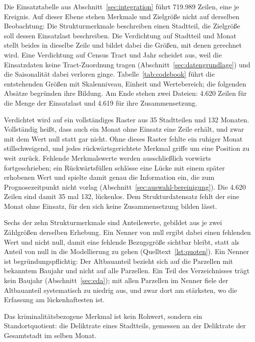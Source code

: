 Die Einsatztabelle aus Abschnitt~\ref{sec:integration} führt 719.989 Zeilen,
eine je Ereignis. Auf dieser Ebene stehen Merkmale und Zielgröße nicht auf
derselben Beobachtung: Die Strukturmerkmale beschreiben einen Stadtteil, die
Zielgröße soll dessen Einsatzlast beschreiben. Die Verdichtung auf Stadtteil
und Monat stellt beides in dieselbe Zeile und bildet dabei die Größen, mit
denen gerechnet wird. Eine Verdichtung auf Census Tract und Jahr scheidet aus,
weil die Einsatzdaten keine Tract-Zuordnung tragen
(Abschnitt~\ref{sec:datengrundlage}) und die Saisonalität dabei verloren ginge.
Tabelle~\ref{tab:codebook} führt die entstehenden Größen mit Skalenniveau,
Einheit und Wertebereich; die folgenden Absätze begründen ihre Bildung. Am Ende
stehen zwei Dateien: 4.620 Zeilen für die Menge der Einsatzlast und 4.619 für
ihre Zusammensetzung.

Verdichtet wird auf ein vollständiges Raster aus 35 Stadtteilen und 132
Monaten. Vollständig heißt, dass auch ein Monat ohne Einsatz eine Zeile erhält,
und zwar mit dem Wert null statt gar nicht. Ohne dieses Raster fehlte ein
ruhiger Monat stillschweigend, und jedes rückwärtsgerichtete Merkmal griffe um
eine Position zu weit zurück. Fehlende Merkmalswerte werden ausschließlich
vorwärts fortgeschrieben; ein Rückwärtsfüllen schlösse eine Lücke mit einem
später erhobenen Wert und spielte damit genau die Information ein, die zum
Prognosezeitpunkt nicht vorlag (Abschnitt~\ref{sec:auswahl-bereinigung}). Die
4.620 Zeilen sind damit 35 mal 132, lückenlos. Dem Strukturdatensatz fehlt der
eine Monat ohne Einsatz, für den sich keine Zusammensetzung bilden lässt.

Sechs der zehn Strukturmerkmale sind Anteilswerte, gebildet aus je zwei
Zählgrößen derselben Erhebung. Ein Nenner von null ergibt dabei einen fehlenden
Wert und nicht null, damit eine fehlende Bezugsgröße sichtbar bleibt, statt als
Anteil von null in die Modellierung zu gehen (Quelltext~\ref{lst:quoten}). Ein
Nenner ist begründungspflichtig: Der Altbauanteil bezieht sich auf die Parzellen
mit bekanntem Baujahr und nicht auf alle Parzellen. Ein Teil des Verzeichnisses
trägt kein Baujahr (Abschnitt~\ref{sec:eda}); mit allen Parzellen im Nenner
fiele der Altbauanteil systematisch zu niedrig aus, und zwar dort am stärksten,
wo die Erfassung am lückenhaftesten ist.

Das kriminalitätsbezogene Merkmal ist kein Rohwert, sondern ein
Standortquotient: die Deliktrate eines Stadtteils, gemessen an der Deliktrate
der Gesamtstadt im selben Monat.

